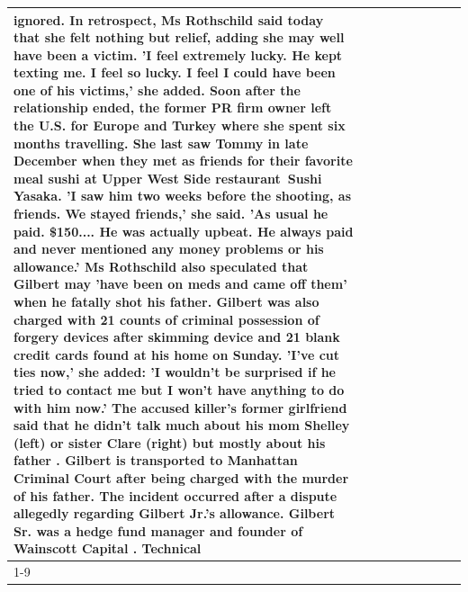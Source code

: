 \begin{table}[H]
\begin{tabular}{lllrlllll}
ignored. In retrospect, Ms Rothschild said today that she felt nothing but relief, adding she may well have been a victim. 'I feel extremely lucky. He kept texting me. I feel so lucky. I feel I could have been one of his victims,' she added. Soon after the relationship ended, the former PR firm owner left the U.S. for Europe and Turkey where she spent six months  travelling. She last saw Tommy in late December when they met as friends for their favorite meal sushi at Upper West Side restaurant Sushi Yasaka. 'I saw him two weeks before the shooting, as friends. We stayed friends,' she said. 'As usual he paid. \$150.... He was actually upbeat. He always paid and never mentioned any money problems or his allowance.' Ms Rothschild also speculated that Gilbert may 'have been on meds and came off them' when he fatally shot his father. Gilbert was also charged with 21 counts of criminal possession of forgery devices after skimming device and 21 blank credit cards found at his home on Sunday. 'I've cut ties now,' she added: 'I wouldn’t be surprised if he tried to contact me but I won’t have anything to do with him now.' The accused killer's former girlfriend said that he didn't talk much about his mom Shelley (left) or sister Clare (right) but mostly about his father . Gilbert is transported to Manhattan Criminal Court  after being charged with the murder of his father. The incident occurred after a dispute allegedly regarding Gilbert Jr.'s allowance. Gilbert Sr. was a hedge fund manager and founder of Wainscott Capital . Technical \\
\cline{1-9}

\end{tabular}
\end{table}
